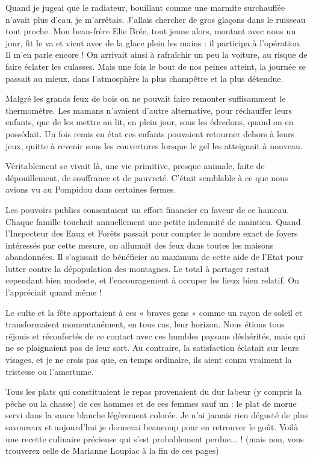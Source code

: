 Quand je jugeai que le radiateur, bouillant comme une marmite surchauffée n’avait
plus d’eau, je m’arrêtais. J’allais chercher de gros glaçons dans le ruisseau tout
proche. Mon beau-frère Elie Brée, tout jeune alors, montant avec nous un jour, fit le
va et vient avec de la glace plein les mains : il participa à l’opération. Il m’en parle
encore ! On arrivait ainsi à rafraîchir un peu la voiture, au risque de faire éclater les
culasses. Mais une fois le bout de nos peines atteint, la journée se passait au mieux,
dans l’atmosphère la plus champêtre et la plus détendue.


Malgré les grands feux de bois on ne pouvait faire remonter suffisamment le
thermomètre. Les mamans n’avaient d’autre alternative, pour réchauffer leurs enfants,
que de les mettre au lit, en plein jour, sous les édredons, quand on en possédait. Un
fois remis en état ces enfants pouvaient retourner dehors à leurs jeux, quitte à revenir
sous les couvertures lorsque le gel les atteignait à nouveau.

Véritablement se vivait là, une vie primitive, presque animale, faite de dépouillement,
de souffrance et de pauvreté. C’était semblable à ce que nous avions vu au Pompidou
dans certaines fermes.

Les pouvoirs publics consentaient un effort financier en faveur de ce hameau. Chaque
famille touchait annuellement une petite indemnité de maintien. Quand l’Inspecteur
des Eaux et Forêts passait pour compter le nombre exact de foyers intéressés par cette
mesure, on allumait des feux dans toutes les maisons abandonnées. Il s’agissait de
bénéficier au maximum de cette aide de l’Etat pour lutter contre la dépopulation des
montagnes. Le total à partager restait cependant bien modeste, et l’encouragement à
occuper les lieux bien relatif. On l’appréciait quand même !

Le culte et la fête apportaient à ces « braves gens » comme un rayon de soleil et
transformaient momentanément, en tous cas, leur horizon. Nous étions tous réjouis et
réconfortés de ce contact avec ces humbles paysans déshérités, mais qui ne se
plaignaient pas de leur sort. Au contraire, la satisfaction éclatait sur leurs visages, et
je ne crois pas que, en temps ordinaire, ils aient connu vraiment la tristesse ou
l’amertume.

Tous les plats qui constituaient le repas provenaient du dur labeur (y compris la pêche
ou la chasse) de ces hommes et de ces femmes sauf un : le plat de morue servi dans la
sauce blanche légèrement colorée. Je n’ai jamais rien dégusté de plus savoureux et
aujourd’hui je donnerai beaucoup pour en retrouver le goût. Voilà une recette
culinaire précieuse qui s’est probablement perdue... ! (mais non, vous trouverez celle de
Marianne Loupiac à la fin de ces pages)


